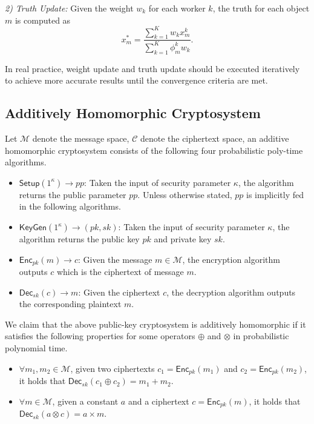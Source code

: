 \documentclass[conference]{IEEEtran}
\begin{document}
\textit{2) Truth Update:} Given the weight $w_k$ for each worker $k$, the truth for each object $m$ is computed as
\begin{equation*}
x_m^* = \frac{\sum_{k=1}^K w_k x_m^k}{\sum_{k=1}^K \phi_m^k w_k }.
\end{equation*}

In real practice, weight update and truth update should be executed iteratively to achieve more accurate results until the convergence criteria are met.

\subsection{Additively Homomorphic Cryptosystem}\label{sec4-b}
Let $\mathcal{M}$ denote the message space, $\mathcal{C}$ denote the ciphertext space, an additive homomorphic cryptosystem consists of the following four probabilistic poly-time algorithms.

\begin{itemize}
  \item $\mathsf{Setup}(1^\kappa)\to pp$: Taken the input of security parameter $\kappa$, the algorithm returns the public parameter $pp$. Unless otherwise stated, $pp$ is implicitly fed in the following algorithms.
  \item $\mathsf{KeyGen}(1^\kappa)\to (pk, sk)$: Taken the input of security parameter $\kappa$, the algorithm returns the public key $pk$ and private key $sk$.
  \item $\mathsf{Enc}_{pk}(m)\to c$: Given the message $m\in\mathcal{M}$, the encryption algorithm outputs $c$ which is the ciphertext of message $m$.
  \item $\mathsf{Dec}_{sk}(c)\to m$: Given the ciphertext $c$, the decryption algorithm outputs the corresponding plaintext $m$.
\end{itemize}

We claim that the above public-key cryptosystem is additively homomorphic if it satisfies the following properties for some operators $\oplus$ and $\otimes$ in probabilistic polynomial time.

\begin{itemize}
  \item $\forall m_1,m_2\in\mathcal{M}$, given two ciphertexts $c_1 = \mathsf{Enc}_{pk}(m_1)$ and $c_2 = \mathsf{Enc}_{pk}(m_2)$, it holds that $\mathsf{Dec}_{sk}(c_1 \oplus c_2) = m_1 + m_2$.
  \item $\forall m\in\mathcal{M}$, given a constant $a$ and a ciphertext $c=\mathsf{Enc}_{pk}(m)$, it holds that $\mathsf{Dec}_{sk}(a \otimes c) = a \times m$.
\end{itemize}
\end{document}
